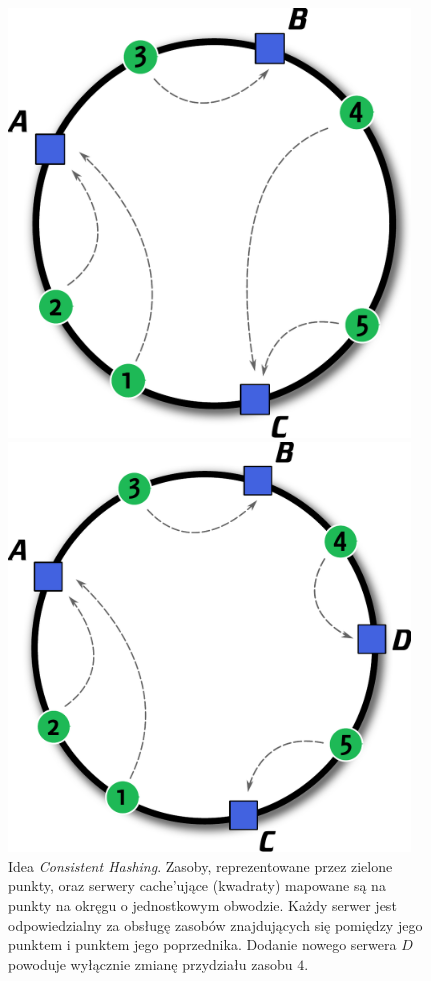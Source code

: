 \documentclass[a4paper,11pt]{scrartcl}
\newcommand{\s}{ }
\newcommand{\keszujace}{cache'ujące}
\begin{document}
\begin{figure}[ht]
\centering
\begin{minipage}[b]{0.445\linewidth}
\centering
\includegraphics[width=0.95\textwidth]{img/consistent.pdf}
\end{minipage}
\begin{minipage}[b]{0.47\linewidth}
\centering
\includegraphics[width=0.95\textwidth]{img/consistent_2.pdf}
\end{minipage}
\caption{Idea \textit{Consistent Hashing}. Zasoby, reprezentowane przez zielone punkty, oraz serwery \keszujace\s (kwadraty) mapowane są na punkty na okręgu o jednostkowym obwodzie. Każdy serwer jest odpowiedzialny za obsługę zasobów znajdujących się pomiędzy jego punktem i punktem jego poprzednika. Dodanie nowego serwera $D$ powoduje wyłącznie zmianę przydziału zasobu $4$.}
\label{fig_consistent_hashing}
\end{figure}
\end{document}
